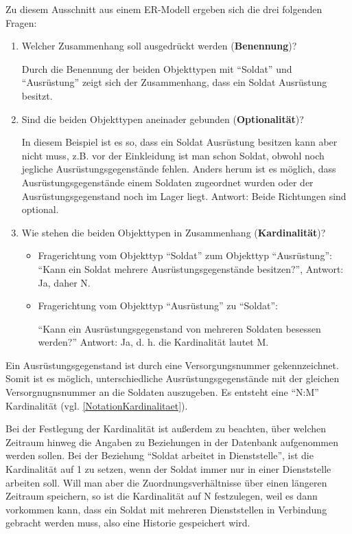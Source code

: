         Zu diesem Ausschnitt aus einem ER-Modell ergeben sich die drei folgenden Fragen:
        \begin{enumerate}
          \item Welcher Zusammenhang soll ausgedr\"uckt werden (\textbf{Benennung})?

          Durch die Benennung der beiden Objekttypen mit \enquote{Soldat} und \enquote{Ausr\"ustung} zeigt sich der Zusammenhang, dass ein Soldat Ausr\"ustung besitzt.
          \item Sind die beiden Objekttypen aneinader gebunden (\textbf{Optionalit\"at})?

          In diesem Beispiel ist es so, dass ein Soldat Ausr\"ustung besitzen kann aber nicht muss, z.B. vor der Einkleidung ist man schon Soldat, obwohl noch jegliche Ausr\"ustungsgegenst\"ande fehlen. Anders herum ist es m\"oglich, dass Ausr\"ustungsgegenst\"ande einem Soldaten
          zugeordnet wurden oder der Ausr\"ustungsgegenstand noch im Lager liegt.
          Antwort: Beide Richtungen sind optional.
          \item Wie stehen die beiden Objekttypen in Zusammenhang (\textbf{Kardinalit\"at})?

          \begin{itemize}
            \item Fragerichtung vom Objekttyp \enquote{Soldat}  zum Objekttyp \enquote{Ausr\"ustung}:
            \enquote{Kann ein Soldat mehrere Ausr\"ustungsgegenst\"ande besitzen?}, Antwort: Ja, daher N.
            \item Fragerichtung vom Objekttyp \enquote{Ausr\"ustung}  zu \enquote{Soldat}:

            \enquote{Kann ein Ausr\"ustungsgegenstand von mehreren Soldaten besessen werden?}
            Antwort: Ja, d. h. die Kardinalit\"at lautet M.
          \end{itemize}
        \end{enumerate}
        Ein Ausr\"ustungsgegenstand ist durch eine Versorgungsnummer
        gekennzeichnet. Somit ist es m\"oglich, unterschiedliche
        Ausr\"ustungsgegenst\"ande mit der gleichen Versorgnugnsnummer an die
        Soldaten auszugeben. Es entsteht eine \enquote{N:M} Kardinalit\"at (vgl.
        \ref{NotationKardinalitaet}).

        Bei der Festlegung der Kardinalit\"at ist au\ss erdem zu beachten,
        \"uber welchen Zeitraum hinweg die Angaben zu Beziehungen in der
        Datenbank aufgenommen werden sollen. Bei der Beziehung \enquote{Soldat
        arbeitet in Dienststelle}, ist die Kardinalit\"at auf 1 zu setzen, wenn
        der Soldat immer nur in einer Dienststelle arbeiten soll. Will man aber
        die Zuordnungsverh\"altnisse \"uber einen l\"angeren Zeitraum speichern,
        so ist die Kardinalit\"at auf N festzulegen, weil es dann vorkommen
        kann, dass ein Soldat mit mehreren Dienststellen in Verbindung gebracht
        werden muss, also eine Historie gespeichert wird.
